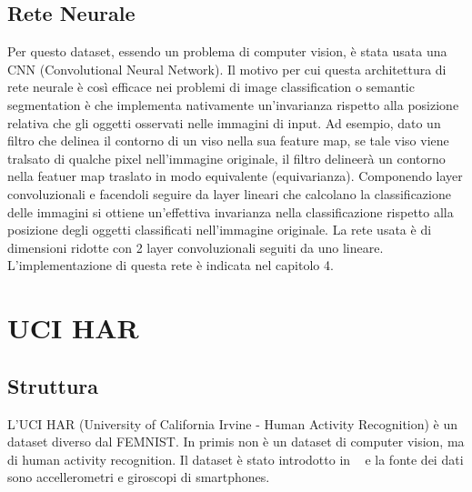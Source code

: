 \subsection{Rete Neurale}
Per questo dataset, essendo un problema di computer vision, è stata
usata una CNN (Convolutional Neural Network). Il motivo per cui questa 
architettura di rete neurale è così efficace nei problemi di image 
classification o semantic segmentation è che implementa nativamente 
un'invarianza rispetto alla posizione relativa che gli oggetti 
osservati nelle immagini 
di input. Ad esempio, dato un filtro che delinea il contorno di un 
viso nella sua feature map, se tale viso viene tralsato di qualche 
pixel nell'immagine originale, il filtro delineerà un contorno nella 
featuer map traslato in modo equivalente (equivarianza). Componendo 
layer convoluzionali e facendoli seguire da layer lineari che calcolano 
la classificazione delle immagini si ottiene un'effettiva invarianza 
nella classificazione rispetto alla posizione degli oggetti classificati 
nell'immagine originale. La rete usata è di dimensioni ridotte con 2 
layer convoluzionali seguiti da uno lineare. L'implementazione di questa 
rete è indicata nel capitolo 4.


\section{UCI HAR}
\subsection{Struttura}
L'UCI HAR (University of California Irvine -
Human Activity Recognition) è un dataset diverso dal FEMNIST. In primis
non è un dataset di computer vision, ma di human activity recognition.
Il dataset è stato introdotto in ~\cite{Anguita2013APD} e la fonte dei
dati sono accellerometri e giroscopi di smartphones.

